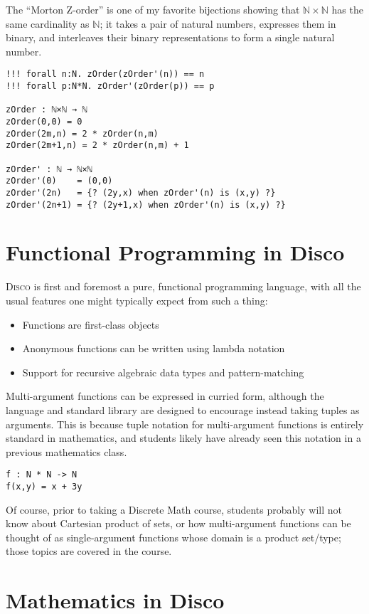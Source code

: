 \documentclass[submission,copyright,creativecommons]{eptcs}
\newcommand{\N}{\mathbb{N}}
\newcommand{\disco}{\textsc{Disco}\xspace}
\begin{document}
The ``Morton Z-order'' is one of my favorite bijections showing that
$\N \times \N$ has the same cardinality as $\N$; it takes a pair of
natural numbers, expresses them in binary, and interleaves their
binary representations to form a single natural number.

\begin{verbatim}
!!! forall n:N. zOrder(zOrder'(n)) == n
!!! forall p:N*N. zOrder'(zOrder(p)) == p

zOrder : ℕ×ℕ → ℕ
zOrder(0,0) = 0
zOrder(2m,n) = 2 * zOrder(n,m)
zOrder(2m+1,n) = 2 * zOrder(n,m) + 1

zOrder' : ℕ → ℕ×ℕ
zOrder'(0)    = (0,0)
zOrder'(2n)   = {? (2y,x) when zOrder'(n) is (x,y) ?}
zOrder'(2n+1) = {? (2y+1,x) when zOrder'(n) is (x,y) ?}
\end{verbatim}

\section{Functional Programming in Disco}
\label{sec:FP}

\disco is first and foremost a pure, functional programming language,
with all the usual features one might typically expect from such a thing:
\begin{itemize}
\item Functions are first-class objects
\item Anonymous functions can be written using lambda notation
\item Support for recursive algebraic data types and pattern-matching
\end{itemize}

Multi-argument functions can be expressed in curried form, although
the language and standard library are designed to encourage instead
taking tuples as arguments.  This is because tuple notation for
multi-argument functions is entirely standard in mathematics, and
students likely have already seen this notation in a previous
mathematics class.

\begin{verbatim}
f : N * N -> N
f(x,y) = x + 3y
\end{verbatim}

Of course, prior to taking a Discrete Math course, students probably
will not know about Cartesian product of sets, or how multi-argument
functions can be thought of as single-argument functions whose domain
is a product set/type; those topics are covered in the course.

\section{Mathematics in Disco}
\label{sec:math}
\end{document}
